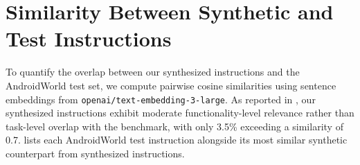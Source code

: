 \documentclass{article} %
\begin{document}
\section{Similarity Between Synthetic and Test Instructions}
\label{app:overlap_detail}

To quantify the overlap between our synthesized instructions and the AndroidWorld test set, we compute pairwise cosine similarities using sentence embeddings from \texttt{openai/text-embedding-3-large}.
As reported in , our synthesized instructions exhibit moderate functionality-level relevance rather than task-level overlap with the benchmark, with only 3.5\% exceeding a similarity of 0.7.
 lists each AndroidWorld test instruction alongside its most similar synthetic counterpart from synthesized instructions.
\end{document}
